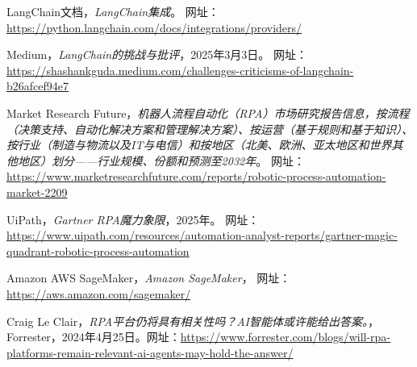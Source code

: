 \documentclass[11pt, a4paper, oneside]{article}
\begin{document}
\begin{thebibliography}{99}
    LangChain文档，\textit{LangChain集成}。
    网址：\url{https://python.langchain.com/docs/integrations/providers/}

    Medium，\textit{LangChain的挑战与批评}，2025年3月3日。
    网址：\url{https://shashankguda.medium.com/challenges-criticisms-of-langchain-b26afcef94e7}

    Market Research Future，\textit{机器人流程自动化（RPA）市场研究报告信息，按流程（决策支持、自动化解决方案和管理解决方案）、按运营（基于规则和基于知识）、按行业（制造与物流以及IT与电信）和按地区（北美、欧洲、亚太地区和世界其他地区）划分——行业规模、份额和预测至2032年}。
    网址：\url{https://www.marketresearchfuture.com/reports/robotic-process-automation-market-2209}

    UiPath，\textit{Gartner RPA魔力象限}，2025年。
    网址：\url{https://www.uipath.com/resources/automation-analyst-reports/gartner-magic-quadrant-robotic-process-automation}

    Amazon AWS SageMaker，\textit{Amazon SageMaker}，
    网址：\url{https://aws.amazon.com/sagemaker/}



    Craig Le Clair，\textit{RPA平台仍将具有相关性吗？AI智能体或许能给出答案。}，Forrester，2024年4月25日。网址：\url{https://www.forrester.com/blogs/will-rpa-platforms-remain-relevant-ai-agents-may-hold-the-answer/}

\end{thebibliography}
\end{document}
